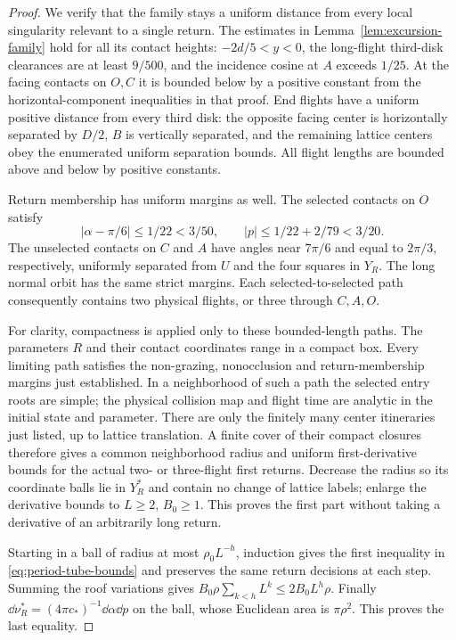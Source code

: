 \begin{proof}
We verify that the family stays a uniform distance from every local
singularity relevant to a single return. The estimates in
Lemma~\ref{lem:excursion-family} hold for all its contact heights:
$-2d/5<y<0$, the long-flight third-disk clearances are at least
$9/500$, and the incidence cosine at $A$ exceeds $1/25$.
At the facing contacts on $O,C$ it is bounded below by a positive
constant from the horizontal-component inequalities in that proof.
End flights have a uniform positive distance from every third disk:
the opposite facing center is horizontally separated by $D/2$,
$B$ is vertically separated, and the remaining lattice centers obey
the enumerated uniform separation bounds. All flight lengths are
bounded above and below by positive constants.

Return membership has uniform margins as well. The selected contacts
on $O$ satisfy
\[
 |\alpha-\pi/6|\le1/22<3/50,\qquad
 |p|\le1/22+2/79<3/20.
\]
The unselected contacts on $C$ and $A$ have angles near $7\pi/6$
and equal to $2\pi/3$, respectively, uniformly separated from $U$
and the four squares in $Y_R$. The long normal orbit has the same
strict margins. Each selected-to-selected path consequently contains
two physical flights, or three through $C,A,O$.

For clarity, compactness is applied only to these bounded-length
paths. The parameters $R$ and their contact coordinates range in a
compact box. Every limiting path satisfies the non-grazing,
nonocclusion and return-membership margins just established. In a
neighborhood of such a path the selected entry roots are simple;
the physical collision map and flight time are analytic in the
initial state and parameter. There are only the finitely many
center itineraries just listed, up to lattice translation. A finite
cover of their compact closures therefore gives a common neighborhood
radius and uniform first-derivative bounds for the actual two- or
three-flight first returns. Decrease the radius so its coordinate
balls lie in $Y_R^*$ and contain no change of lattice labels; enlarge
the derivative bounds to $L\ge2$, $B_0\ge1$. This proves the first
part without taking a derivative of an arbitrarily long return.

Starting in a ball of radius at most $\rho_0L^{-h}$, induction gives
the first inequality in \eqref{eq:period-tube-bounds} and preserves
the same return decisions at each step. Summing the roof variations
gives $B_0\rho\sum_{k<h}L^k\le2B_0L^h\rho$. Finally
$\dd\nu_R^*=(4\pi c_*)^{-1}\dd\alpha\dd p$ on the ball, whose
Euclidean area is $\pi\rho^2$. This proves the last equality.
\end{proof}

